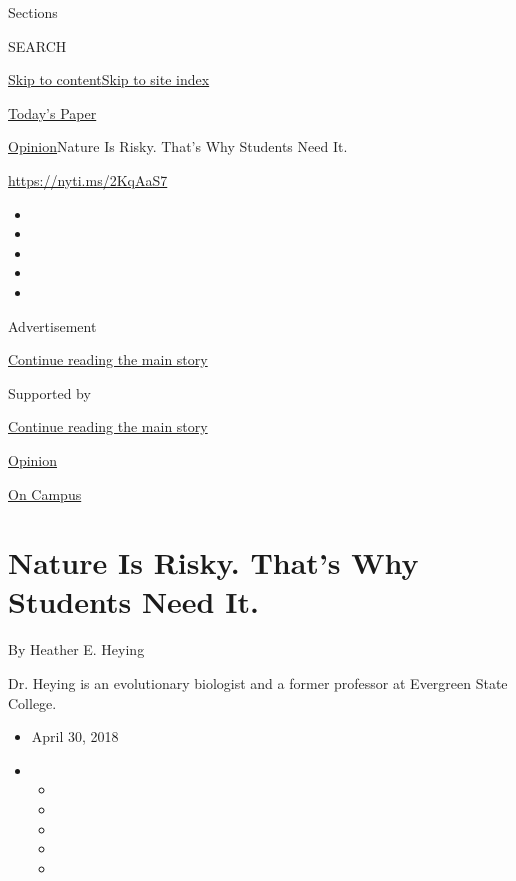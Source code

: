 Sections

SEARCH

\protect\hyperlink{site-content}{Skip to
content}\protect\hyperlink{site-index}{Skip to site index}

\href{https://myaccount.nytimes3xbfgragh.onion/auth/login?response_type=cookie\&client_id=vi}{}

\href{https://www.nytimes3xbfgragh.onion/section/todayspaper}{Today's
Paper}

\href{/section/opinion}{Opinion}\textbar{}Nature Is Risky. That's Why
Students Need It.

\url{https://nyti.ms/2KqAaS7}

\begin{itemize}
\item
\item
\item
\item
\item
\end{itemize}

Advertisement

\protect\hyperlink{after-top}{Continue reading the main story}

Supported by

\protect\hyperlink{after-sponsor}{Continue reading the main story}

\href{/section/opinion}{Opinion}

\href{/column/on-campus}{On Campus}

\hypertarget{nature-is-risky-thats-why-students-need-it}{%
\section{Nature Is Risky. That's Why Students Need
It.}\label{nature-is-risky-thats-why-students-need-it}}

By Heather E. Heying

Dr. Heying is an evolutionary biologist and a former professor at
Evergreen State College.

\begin{itemize}
\item
  April 30, 2018
\item
  \begin{itemize}
  \item
  \item
  \item
  \item
  \item
  \end{itemize}
\end{itemize}

